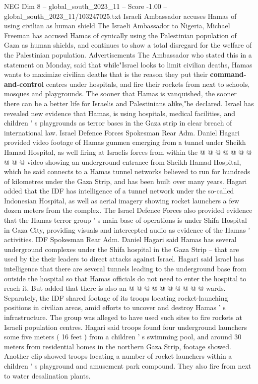 \begin{textsample}{NEG Dim 8 – global\_south\_2023\_11 – Score -1.00 – global\_south\_2023\_11/103247025.txt}  \label{ex:f8_neg_181}
Israeli Ambassador accuses Hamas of using civilian as human shield The Israeli Ambassador to Nigeria, Michael Freeman has accused Hamas of cynically using the Palestinian population of Gaza as human shields, and continues to show a total disregard for the welfare of the Palestinian population.
Advertisements The Ambassador who stated this in a statement on Monday, said that while"Israel looks to limit civilian deaths, Hamas wants to maximize civilian deaths that is the reason they put their \textbf{command-and-control} centres under hospitals, and fire their rockets from next to schools, mosques and playgrounds.
The sooner that Hamas is vanquished, the sooner there can be a better life for Israelis and Palestinians alike,"he declared.
Israel has revealed new evidence that Hamas, is using hospitals, medical facilities, and children ' s playgrounds as terror bases in the Gaza strip in clear breach of international law.
Israel Defence Forces Spokesman Rear Adm.
Daniel Hagari provided video footage of Hamas gunmen emerging from a tunnel under Sheikh Hamad Hospital, as well firing at Israelis forces from within the @ @ @ @ @ @ @ @ @ @ video showing an underground entrance from Sheikh Hamad Hospital, which he said connects to a Hamas tunnel networks believed to run for hundreds of kilometres under the Gaza Strip, and has been built over many years.
Hagari added that the IDF has intelligence of a tunnel network under the so-called Indonesian Hospital, as well as aerial imagery showing rocket launchers a few dozen meters from the complex.
The Israel Defence Forces also provided evidence that the Hamas terror group ' s main base of operations is under Shifa Hospital in Gaza City, providing visuals and intercepted audio as evidence of the Hamas ' activities.
IDF Spokesman Rear Adm.
Daniel Hagari said Hamas has several underground complexes under the Shifa hospital in the Gaza Strip -- that are used by the their leaders to direct attacks against Israel.
Hagari said Israel has intelligence that there are several tunnels leading to the underground base from outside the hospital so that Hamas officials do not need to enter the hospital to reach it.
But added that there is also an @ @ @ @ @ @ @ @ @ @ wards.
Separately, the IDF shared footage of its troops locating rocket-launching positions in civilian areas, amid efforts to uncover and destroy Hamas ' s infrastructure.
The group was alleged to have used such sites to fire rockets at Israeli population centres.
Hagari said troops found four underground launchers some five meters ( 16 feet ) from a children ' s swimming pool, and around 30 meters from residential homes in the northern Gaza Strip, footage showed.
Another clip showed troops locating a number of rocket launchers within a children ' s playground and amusement park compound.
They also fire from next to water desalination plants.

\end{textsample}
